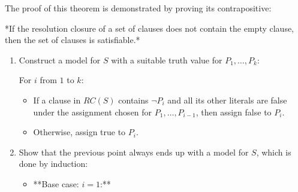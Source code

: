 \documentclass[12pt]{article}
\begin{document}
\begin{enumerate}[label=\textbf{PL.\arabic*}]
          The proof of this theorem is demonstrated by proving its contrapositive:
          \begin{center}
              *If the resolution closure of a set of clauses does not contain the empty clause, then the set of clauses is satisfiable.*
          \end{center}

          \begin{enumerate}
              \item Construct a model for $S$ with a suitable truth value for $P_1, \ldots, P_k$:

                    For $i$ from $1$ to $k$:
                    \begin{itemize}
                        \item If a clause in $RC(S)$ contains $\lnot P_i$ and all its other literals are false under the assignment chosen for $P_1, \ldots, P_{i-1}$, then assign false to $P_i$.
                        \item Otherwise, assign true to $P_i$.
                    \end{itemize}
              \item Show that the previous point always ends up with a model for $S$, which is done by induction:
                    \begin{itemize}
                        \item **Base case: $i = 1$:**


\end{itemize}
\end{enumerate}
\end{enumerate}
\end{document}
